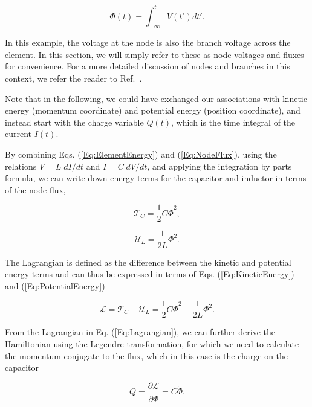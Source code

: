 \documentclass[aip,apr,twocolumn,showpacs,superscriptaddress,groupedaddress,nofootinbib,reprint]{revtex4-1}  %
\begin{document}
\begin{equation}
\Phi(t) = \int_{-\infty}^{t} V(t')dt'.
\label{Eq:NodeFlux}
\end{equation}

\noindent In this example, the voltage at the node is also the branch voltage across the element. In this section, we will simply refer to these as node voltages and fluxes for convenience. For a more detailed discussion of nodes and branches in this context, we refer the reader to Ref.~.

Note that in the following, we could have exchanged our associations with kinetic energy (momentum coordinate) and potential energy (position coordinate), and instead start with the charge variable $Q(t)$, which is the time integral of the current $I(t)$.

By combining Eqs. (\ref{Eq:ElementEnergy}) and (\ref{Eq:NodeFlux}), using the relations $V=L \; dI/dt$ and $I=C \; dV/dt$, and applying the integration by parts formula, we can write down energy terms for the capacitor and inductor in terms of the node flux,

\begin{equation}
\mathcal{T}_C = \frac{1}{2}C\dot{\Phi}^2,
\label{Eq:KineticEnergy}
\end{equation}

\begin{equation}
\mathcal{U}_L = \frac{1}{2L}\Phi^2.
\label{Eq:PotentialEnergy}
\end{equation}

The Lagrangian is defined as the difference between the kinetic and potential energy terms and can thus be expressed in terms of Eqs. (\ref{Eq:KineticEnergy}) and (\ref{Eq:PotentialEnergy})

\begin{equation}
\mathcal{L} = \mathcal{T}_{C} - \mathcal{U}_L = \frac{1}{2}C\dot{\Phi}^2 - \frac{1}{2L}\Phi^2.
\label{Eq:Lagrangian}
\end{equation}

From the Lagrangian in Eq. (\ref{Eq:Lagrangian}), we can further derive the Hamiltonian using the Legendre transformation, for which we need to calculate the momentum conjugate to the flux, which in this case is the charge on the capacitor

\begin{equation}
Q = \frac{\partial \mathcal{L}}{\partial \dot{\Phi}} = C\dot{\Phi}.
\end{equation}
\end{document}

